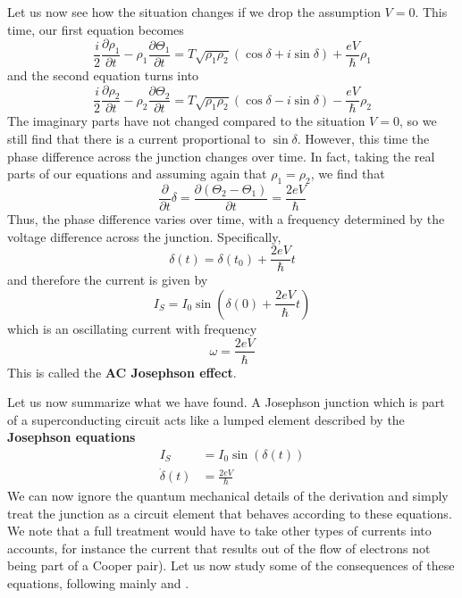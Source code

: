 \documentclass[a4paper, draft]{article}
\theoremstyle{own}
\theoremstyle{remark}
\begin{document}
Let us now see how the situation changes if we drop the assumption $V = 0$. This time, our first equation becomes
$$
\frac{i }{2} \frac{\partial \rho_1}{\partial t} 
- 
\rho_1 \frac{\partial \Theta_1}{\partial t}
=
 T \sqrt{\rho_1 \rho_2} (\cos \delta + i \sin \delta) + \frac{eV}{\hbar} \rho_1
$$
and the second equation turns into
$$
\frac{i }{2} \frac{\partial \rho_2}{\partial t} 
- 
\rho_2 \frac{\partial \Theta_2}{\partial t}
=
T \sqrt{\rho_1 \rho_2} (\cos \delta - i \sin \delta) - \frac{eV}{\hbar} \rho_2
$$
The imaginary parts have not changed compared to the situation $V = 0$, so we still find that there is a current proportional to $\sin \delta$. However, this time the phase difference across the junction changes over time. In fact, taking the real parts of our equations and assuming again that $\rho_1 = \rho_2$, we find that
$$
\frac{\partial}{\partial t} \delta = \frac{\partial (\Theta_2 - \Theta_1)}{\partial t} =   \frac{2eV}{\hbar}
$$
Thus, the phase difference varies over time, with a frequency determined by the voltage difference across the junction. Specifically, 
$$
\delta(t) = \delta(t_0) + \frac{2eV}{\hbar} t
$$
and therefore the current is given by
$$
I_S = I_0 \sin (\delta(0) + \frac{2eV}{\hbar} t)
$$
which is an oscillating current with frequency 
$$
\omega = \frac{2eV}{\hbar}
$$
This is called the {\bf AC Josephson effect}.

Let us now summarize what we have found. A Josephson junction which is part of a superconducting circuit acts like a lumped element described by the {\bf Josephson equations}
\begin{align}\label{eq:josephson}
I_S &= I_0 \sin (\delta(t)) \\
\dot{\delta}(t) &=  \frac{2eV}{\hbar} 
\end{align}
We can now ignore the quantum mechanical details of the derivation and simply treat the junction as a circuit element that behaves according to these equations. We note that a full treatment would have to take other types of currents into accounts, for instance the current that results out of the flow of electrons not being part of a Cooper pair). Let us now study some of the consequences of these equations, following mainly \cite{Likharev} and \cite{GrossMarxLectureNotes}. 
\end{document}
